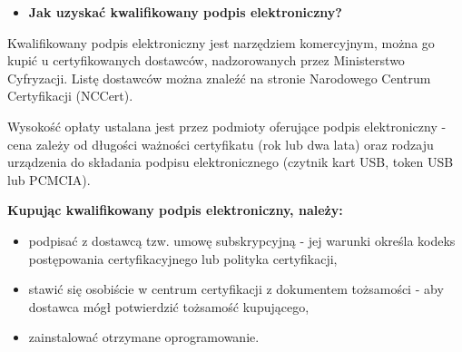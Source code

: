 \documentclass[12pt]{article}
\renewcommand{\_}{\kern-1.5pt\textunderscore\kern-1.5pt}
\begin{document}
\begin{itemize}
\begin{itemize}
\begin{itemize}
\begin{itemize}
\vspace{\baselineskip}

\vspace{\baselineskip}

\vspace{\baselineskip}

\vspace{\baselineskip}

\end{itemize}
\end{itemize}
	\item \textbf{Jak uzyskać kwalifikowany podpis elektroniczny?}
\end{itemize}
\end{itemize}\par

Kwalifikowany podpis elektroniczny jest narzędziem komercyjnym, można go kupić u certyfikowanych dostawców, nadzorowanych przez Ministerstwo Cyfryzacji. Listę dostawców można znaleźć na stronie Narodowego Centrum Certyfikacji (NCCert).\par


\vspace{\baselineskip}
Wysokość opłaty ustalana jest przez podmioty oferujące podpis elektroniczny - cena zależy od długości ważności certyfikatu (rok lub dwa lata) oraz rodzaju urządzenia do składania podpisu elektronicznego (czytnik kart USB, token USB lub PCMCIA).\par


\vspace{\baselineskip}
\textbf{Kupując kwalifikowany podpis elektroniczny, należy:}\par


\vspace{\baselineskip}
\begin{itemize}
	\item podpisać z dostawcą tzw. umowę subskrypcyjną - jej warunki określa kodeks postępowania certyfikacyjnego lub polityka certyfikacji,\par


\vspace{\baselineskip}
	\item stawić się osobiście w centrum certyfikacji z dokumentem tożsamości - aby dostawca mógł potwierdzić tożsamość kupującego,\par


\vspace{\baselineskip}
	\item zainstalować otrzymane oprogramowanie.
\end{itemize}\par
\end{document}
